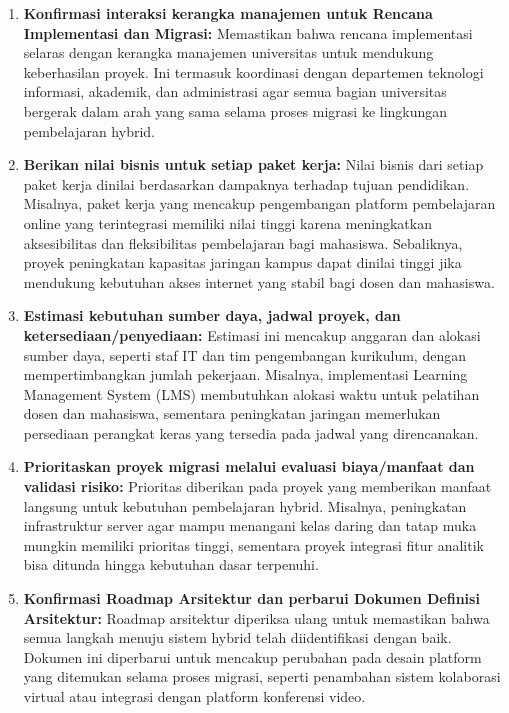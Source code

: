 \begin{enumerate}
	\item \textbf{Konfirmasi interaksi kerangka manajemen untuk Rencana Implementasi dan Migrasi:} 
	Memastikan bahwa rencana implementasi selaras dengan kerangka manajemen universitas untuk mendukung keberhasilan proyek. Ini termasuk koordinasi dengan departemen teknologi informasi, akademik, dan administrasi agar semua bagian universitas bergerak dalam arah yang sama selama proses migrasi ke lingkungan pembelajaran hybrid.
	
	\item \textbf{Berikan nilai bisnis untuk setiap paket kerja:} 
	Nilai bisnis dari setiap paket kerja dinilai berdasarkan dampaknya terhadap tujuan pendidikan. Misalnya, paket kerja yang mencakup pengembangan platform pembelajaran online yang terintegrasi memiliki nilai tinggi karena meningkatkan aksesibilitas dan fleksibilitas pembelajaran bagi mahasiswa. Sebaliknya, proyek peningkatan kapasitas jaringan kampus dapat dinilai tinggi jika mendukung kebutuhan akses internet yang stabil bagi dosen dan mahasiswa.
	
	\item \textbf{Estimasi kebutuhan sumber daya, jadwal proyek, dan ketersediaan/penyediaan:} 
	Estimasi ini mencakup anggaran dan alokasi sumber daya, seperti staf IT dan tim pengembangan kurikulum, dengan mempertimbangkan jumlah pekerjaan. Misalnya, implementasi Learning Management System (LMS) membutuhkan alokasi waktu untuk pelatihan dosen dan mahasiswa, sementara peningkatan jaringan memerlukan persediaan perangkat keras yang tersedia pada jadwal yang direncanakan.
	
	\item \textbf{Prioritaskan proyek migrasi melalui evaluasi biaya/manfaat dan validasi risiko:} 
	Prioritas diberikan pada proyek yang memberikan manfaat langsung untuk kebutuhan pembelajaran hybrid. Misalnya, peningkatan infrastruktur server agar mampu menangani kelas daring dan tatap muka mungkin memiliki prioritas tinggi, sementara proyek integrasi fitur analitik bisa ditunda hingga kebutuhan dasar terpenuhi.
	
	\item \textbf{Konfirmasi Roadmap Arsitektur dan perbarui Dokumen Definisi Arsitektur:} 
	Roadmap arsitektur diperiksa ulang untuk memastikan bahwa semua langkah menuju sistem hybrid telah diidentifikasi dengan baik. Dokumen ini diperbarui untuk mencakup perubahan pada desain platform yang ditemukan selama proses migrasi, seperti penambahan sistem kolaborasi virtual atau integrasi dengan platform konferensi video.
	

\end{enumerate}
